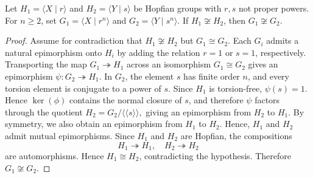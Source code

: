 \documentclass[10pt,a4paper]{amsart}
\begin{document}
\begin{lem}\label{hopf}
Let
\(
H_1=\langle X \mid r\rangle\) and \(H_2=\langle Y \mid s\rangle
\) be
Hopfian groups with $r,s$ not proper powers. For $n\ge2$, set
\(
G_1=\langle X \mid r^n\rangle\) and \(G_2=\langle Y \mid s^n\rangle.
\)
If $H_1 \not\cong H_2$, then
\(
G_1 \not\cong G_2.
\)
\end{lem}

\begin{proof}
Assume for contradiction that $H_1 \not\cong H_2$ but $G_1 \cong G_2$. Each $G_i$ admits a natural epimorphism onto $H_i$ by adding the relation $r=1$ or $s=1$, respectively. Transporting the map $G_1 \twoheadrightarrow H_1$ across an isomorphism $G_1 \cong G_2$ gives an epimorphism
\(
\psi: G_2 \twoheadrightarrow H_1.
\)
In $G_2$, the element $s$ has finite order $n$, and every torsion element is conjugate to a power of $s$. Since $H_1$ is torsion-free, $\psi(s)=1$. Hence $\ker(\phi)$ contains the normal closure of $s$, and therefore $\psi$ factors through the quotient
\(
H_2 = G_2/\!\langle\!\langle s\rangle\!\rangle,
\)
giving an epimorphism from $H_2$ to  $H_1$. By symmetry, we also obtain an epimorphism from $H_1$ to  $H_2$. Hence, $H_1$ and $H_2$ admit mutual epimorphisms. Since $H_1$ and $H_2$ are Hopfian, the compositions
\[
H_1 \twoheadrightarrow H_1,\quad H_2 \twoheadrightarrow H_2
\]
are automorphisms. Hence $H_1 \cong H_2$, contradicting the hypothesis. Therefore $G_1 \not\cong G_2$.
\end{proof}
\end{document}
